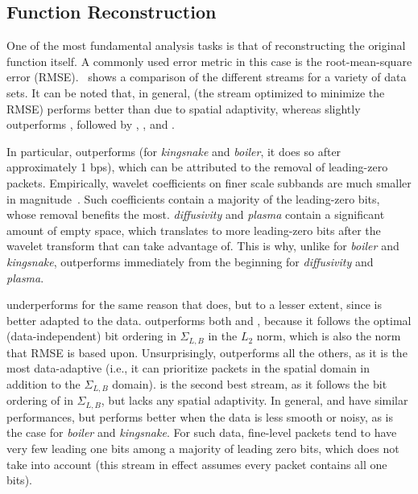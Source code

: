 \subsection{Function Reconstruction}\label{sec:rmse-optimized}

One of the most fundamental analysis tasks is that of reconstructing the original function itself. A
commonly used error metric in this case is the root-mean-square error
(RMSE).~ shows a comparison of the different streams for a variety of data
sets. It can be noted that, in general, \srop (the stream optimized to minimize the RMSE) performs
better than \srsg due to spatial adaptivity, whereas \srsg slightly outperforms \swav, followed by
\sbit, \smag, and \slvl.

In particular, \sbit outperforms \slvl (for \emph{kingsnake} and \emph{boiler}, it does so after
approximately 1 bps), which can be attributed to the removal of leading-zero packets. Empirically,
wavelet coefficients on finer scale subbands are much smaller in magnitude~\cite{spiht1996}. Such
coefficients contain a majority of the leading-zero bits, whose removal benefits \sbit the most.
\emph{diffusivity} and \emph{plasma} contain a significant amount of empty space, which translates
to more leading-zero bits after the wavelet transform that \sbit can take advantage of. This is why,
unlike for \emph{boiler} and \emph{kingsnake}, \sbit outperforms \slvl immediately from the
beginning for \emph{diffusivity} and \emph{plasma}.

\smag underperforms for the same reason that \slvl does, but to a lesser extent, since \smag is
better adapted to the data. \swav outperforms both \slvl and \sbit, because it follows the optimal
(data-independent) bit ordering in $\Sigma_{L,B}$ in the $L_2$ norm, which is also the norm that
RMSE is based upon. Unsurprisingly, \srop outperforms all the others, as it is the most
data-adaptive (i.e., it can prioritize packets in the spatial domain in addition to the
$\Sigma_{L,B}$ domain). \srsg is the second best stream, as it follows the bit ordering of \srop in
$\Sigma_{L,B}$, but lacks any spatial adaptivity. In general, \swav and \ssig have similar
performances, but \ssig performs better when the data is less smooth or noisy, as is the case for
\emph{boiler} and \emph{kingsnake}. For such data, fine-level packets tend to have very few leading
one bits among a majority of leading zero bits, which \swav does not take into account (this stream
in effect assumes every packet contains all one bits).

